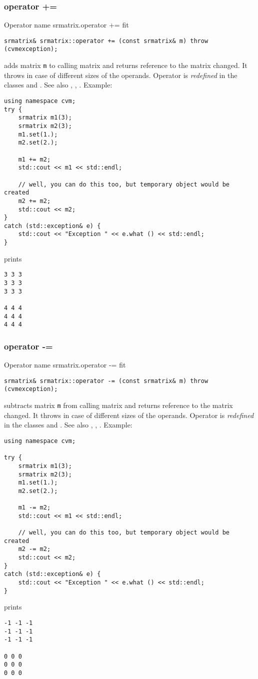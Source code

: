 \subsubsection{operator +=}
Operator%
\pdfdest name {srmatrix.operator +=} fit
\begin{verbatim}
srmatrix& srmatrix::operator += (const srmatrix& m) throw (cvmexception);
\end{verbatim}
adds  matrix \verb"m" to  calling matrix 
and returns  reference to
the matrix changed.
It throws  
in case of different sizes of the operands.
Operator is \emph{redefined} in the classes
and .
See also ,
,
.
Example:
\begin{Verbatim}
using namespace cvm;
try {
    srmatrix m1(3);
    srmatrix m2(3);
    m1.set(1.);
    m2.set(2.);

    m1 += m2;
    std::cout << m1 << std::endl;

    // well, you can do this too, but temporary object would be created
    m2 += m2; 
    std::cout << m2;
}
catch (std::exception& e) {
    std::cout << "Exception " << e.what () << std::endl;
}
\end{Verbatim}
prints
\begin{Verbatim}
3 3 3
3 3 3
3 3 3

4 4 4
4 4 4
4 4 4
\end{Verbatim}
\newpage




\subsubsection{operator -=}
Operator%
\pdfdest name {srmatrix.operator -=} fit
\begin{verbatim}
srmatrix& srmatrix::operator -= (const srmatrix& m) throw (cvmexception);
\end{verbatim}
subtracts  matrix \verb"m" from  calling matrix
and returns  reference to
the matrix changed.
It throws  
in case of different sizes of the operands.
Operator is \emph{redefined} in the classes
and .
See also ,
,
.
Example:
\begin{Verbatim}
using namespace cvm;

try {
    srmatrix m1(3);
    srmatrix m2(3);
    m1.set(1.);
    m2.set(2.);

    m1 -= m2;
    std::cout << m1 << std::endl;

    // well, you can do this too, but temporary object would be created
    m2 -= m2; 
    std::cout << m2;
}
catch (std::exception& e) {
    std::cout << "Exception " << e.what () << std::endl;
}
\end{Verbatim}
prints
\begin{Verbatim}
-1 -1 -1
-1 -1 -1
-1 -1 -1

0 0 0
0 0 0
0 0 0
\end{Verbatim}
\newpage



